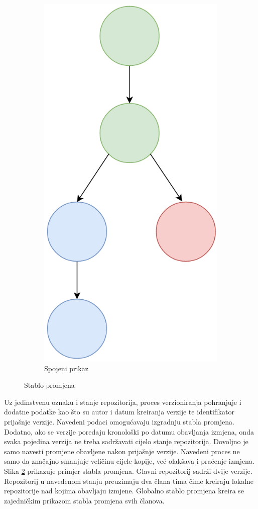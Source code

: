 \documentclass[times, utf8, diplomski, numeric]{fer}
\begin{document}
\begin{figure}[b!]
\begin{subfigure}{.24\textwidth}
\includegraphics[scale=0.4]{VersioningTree}
\caption{Spojeni prikaz}
\label{fig:VersioningTreeD}
\end{subfigure}
\caption{Stablo promjena}
\label{fig:VersioningTree}
\end{figure}

Uz jedinstvenu oznaku i stanje repozitorija, proces verzioniranja pohranjuje i dodatne podatke kao što su autor i datum kreiranja verzije te identifikator prijašnje verzije. Navedeni podaci omogućavaju izgradnju stabla promjena. Dodatno, ako se verzije poredaju kronološki po datumu obavljanja izmjena, onda svaka pojedina verzija ne treba sadržavati cijelo stanje repozitorija. Dovoljno je samo navesti promjene obavljene nakon prijašnje verzije. Navedeni proces ne samo da značajno smanjuje veličinu cijele kopije, već olakšava i praćenje izmjena. Slika \ref{fig:VersioningTree} prikazuje primjer stabla promjena. Glavni repozitorij sadrži dvije verzije. Repozitorij u navedenom stanju preuzimaju dva člana tima čime kreiraju lokalne repozitorije nad kojima obavljaju izmjene. Globalno stablo promjena kreira se zajedničkim prikazom stabla promjena svih članova.
\end{document}
